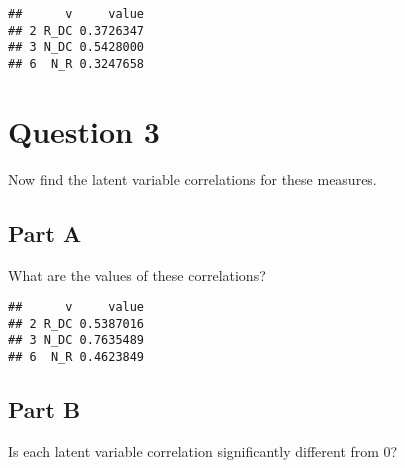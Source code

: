 \documentclass[]{article}
\newenvironment{Shaded}{\begin{snugshade}}{\end{snugshade}}
\newcommand{\KeywordTok}[1]{\textcolor[rgb]{0.13,0.29,0.53}{\textbf{#1}}}
\newcommand{\DataTypeTok}[1]{\textcolor[rgb]{0.13,0.29,0.53}{#1}}
\newcommand{\StringTok}[1]{\textcolor[rgb]{0.31,0.60,0.02}{#1}}
\newcommand{\OtherTok}[1]{\textcolor[rgb]{0.56,0.35,0.01}{#1}}
\newcommand{\OperatorTok}[1]{\textcolor[rgb]{0.81,0.36,0.00}{\textbf{#1}}}
\newcommand{\NormalTok}[1]{#1}
\begin{document}
\begin{verbatim}
##      v     value
## 2 R_DC 0.3726347
## 3 N_DC 0.5428000
## 6  N_R 0.3247658
\end{verbatim}

\section{Question 3}\label{question-3}

Now find the latent variable correlations for these measures.

\subsection{Part A}\label{part-a}

What are the values of these correlations?

\begin{Shaded}
\end{Shaded}

\begin{verbatim}
##      v     value
## 2 R_DC 0.5387016
## 3 N_DC 0.7635489
## 6  N_R 0.4623849
\end{verbatim}

\subsection{Part B}\label{part-b}

Is each latent variable correlation significantly different from 0?
\end{document}
